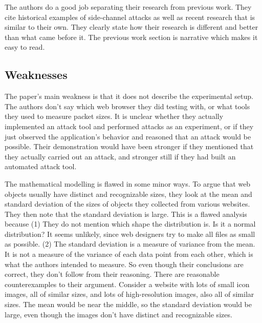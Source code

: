 \documentclass{acm_proc_article-sp}
\begin{document}
The authors do a good job separating their research from previous work. They
cite historical examples of side-channel attacks as well as recent research that
is similar to their own. They clearly state how their research is different and
better than what came before it. The previous work section is narrative which
makes it easy to read.

\subsection{Weaknesses}

The paper's main weakness is that it does not describe the experimental setup.
The authors don't say which web browser they did testing with, or what tools
they used to measure packet sizes. It is unclear whether they actually
implemented an attack tool and performed attacks as an experiment, or if they
just observed the application's behavior and reasoned that an attack would be
possible. Their demonstration would have been stronger if they mentioned that
they actually carried out an attack, and stronger still if they had built an
automated attack tool.

The mathematical modelling is flawed in some minor ways. To argue that web
objects usually have distinct and recognizable sizes, they look at the mean and
standard deviation of the sizes of objects they collected from various websites.
They then note that the standard deviation is large. This is a flawed analysis
because (1) They do not mention which shape the distribution is. Is it a normal
distribution? It seems unlikely, since web designers try to make all files as
small as possible. (2) The standard deviation is a measure of variance from the
mean. It is not a measure of the variance of each data point from each other,
which is what the authors intended to measure. So even though their conclusions
are correct, they don't follow from their reasoning. There are reasonable
counterexamples to their argument. Consider a website with lots of small icon
images, all of similar sizes, and lots of high-resolution images, also all of
similar sizes. The mean would be near the middle, so the standard deviation
would be large, even though the images don't have distinct and recognizable
sizes.
\end{document}

